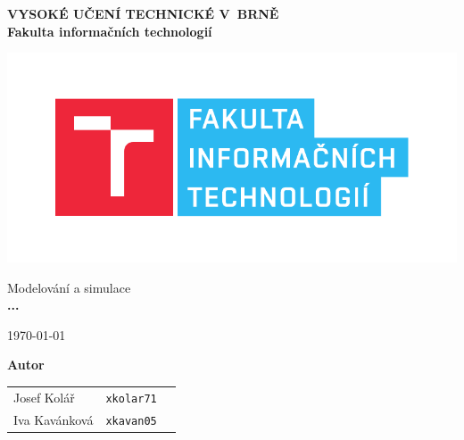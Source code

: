 \begin{titlepage}

    \centering

    {\fontsize{20pt}{15pt}\bfseries
    VYSOKÉ UČENÍ TECHNICKÉ V~BRNĚ\\
    \vspace{8pt}
    Fakulta informačních technologií
    }

    \includegraphics[scale=0.7]{./assets/fit-logo.pdf}

    \vspace{22pt}

    {\Large Modelování a simulace\\}
    \vspace{4pt}
    {\LARGE \bfseries ...}

    \vspace{180pt}
    {\Large \today}

    \vspace{90pt}
    {\Large \bfseries Autor\\}
    \vspace{12pt}

    \begin{tabular}{ l c r }
        Josef Kolář & \texttt{xkolar71} \\
        Iva Kavánková & \texttt{xkavan05} \\
    \end{tabular}\\

\end{titlepage}